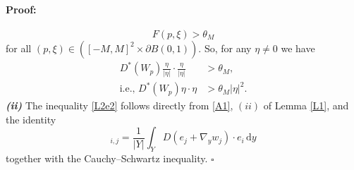 \documentclass[10pt,a4paper]{amsart}
\newcommand{\di}[1]{\,\mathrm{d}#1}
\newenvironment{proof}{\paragraph{Proof:}}{\hfill$\square$}
\begin{document}
\begin{proof}
\begin{equation*}
    F(p,\xi)>\theta_M
\end{equation*}
for all $(p,\xi)\in  ([-M,M]^2\times \partial B(0,1))$.
So, for any $\eta\neq 0$ we have 
\begin{align*}
    D^*(W_p)\frac{\eta}{|\eta|}\cdot \frac{\eta}{|\eta|}&>\theta_M,\\
     \text{i.e., } D^*(W_p)\eta\cdot \eta&>\theta_M|\eta|^2.
\end{align*}
\textbf{\textit{(ii)}} The inequality \eqref{L2e2} follows directly from \ref{A1}, $(ii)$ of Lemma \ref{L1}, and the identity 
\begin{equation*}
    [D^*(W_p)]_{i,j}=\frac{1}{|Y|}\int_Y D\left(e_j+\nabla_y w_j\right)\cdot e_i\di{y}
\end{equation*}together with the Cauchy--Schwartz inequality.
\end{proof}
\end{document}
